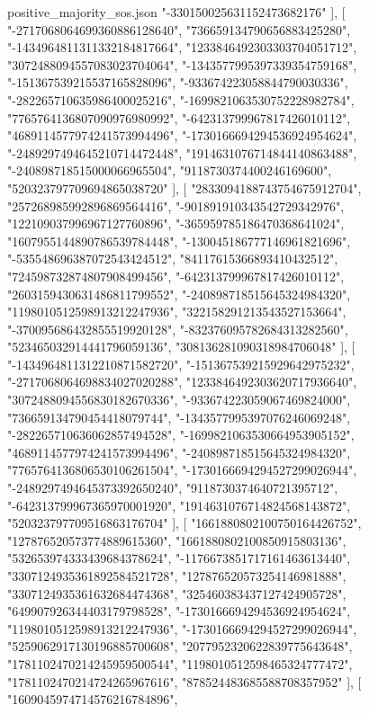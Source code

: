 \begin{filecontents*}[overwrite]{positive_majority_sos.json}
    "-330150025631152473682176"
   ],
   [
    "-2717068064699360886128640",
    "736659134790656883425280",
    "-1434964811311332184817664",
    "1233846492303303704051712",
    "3072488094557083023704064",
    "-1343577995397339354759168",
    "-151367539215537165828096",
    "-933674223058844790030336",
    "-282265710635986400025216",
    "-1699821063530752228982784",
    "7765764136807090976980992",
    "-642313799967817426010112",
    "4689114577974241573994496",
    "-1730166694294536924954624",
    "-2489297494645210714472448",
    "1914631076714844140863488",
    "-240898718515000066965504",
    "9118730374400246169600",
    "520323797709694865038720"
   ],
   [
    "2833094188743754675912704",
    "257268985992896869564416",
    "-901891910343542729342976",
    "122109037996967127760896",
    "-365959785186470368641024",
    "1607955144890786539784448",
    "-130045186777146961821696",
    "-535548696387072543424512",
    "84117615366893410432512",
    "724598732874807908499456",
    "-642313799967817426010112",
    "2603159430631486811799552",
    "-240898718515645324984320",
    "1198010512598913212247936",
    "322158291213543527153664",
    "-370095686432855519920128",
    "-832376095782684313282560",
    "523465032914441796059136",
    "308136281090318984706048"
   ],
   [
    "-1434964811312210871582720",
    "-151367539215929642975232",
    "-2717068064698834027020288",
    "1233846492303620717936640",
    "3072488094556830182670336",
    "-933674223059067469824000",
    "736659134790454418079744",
    "-1343577995397076246069248",
    "-282265710636062857494528",
    "-1699821063530664953905152",
    "4689114577974241573994496",
    "-240898718515645324984320",
    "7765764136806530106261504",
    "-1730166694294527299026944",
    "-2489297494645373392650240",
    "9118730374640721395712",
    "-642313799967365970001920",
    "1914631076714824568143872",
    "520323797709516863176704"
   ],
   [
    "1661880802100750164426752",
    "127876520573774889615360",
    "1661880802100850915803136",
    "532653974333439684378624",
    "-1176673851717161463613440",
    "3307124935361892584521728",
    "127876520573254146981888",
    "3307124935361632684474368",
    "325460383437127424905728",
    "649907926344403179798528",
    "-1730166694294536924954624",
    "1198010512598913212247936",
    "-1730166694294527299026944",
    "5259062917130196885700608",
    "2077952320622839775643648",
    "1781102470214245959500544",
    "1198010512598465324777472",
    "1781102470214724265967616",
    "878524483685588708357952"
   ],
   [
    "1609045974714576216784896",

\end{filecontents*}
